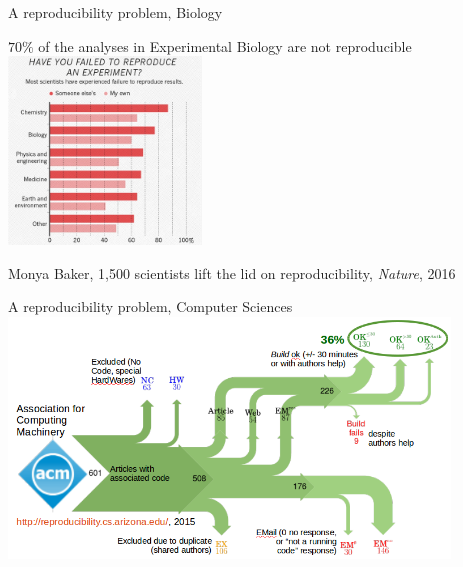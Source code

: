 \begin{frame}{A reproducibility problem, Biology}
\begin{center}
   \alert{$70\%$} of the analyses in Experimental Biology are \alert{not} reproducible
   \vfill
   \includegraphics[height=5cm]{01_introduction/images/FAIR_Baker_survey.png}
\end{center}
\tiny{Monya Baker, 1,500 scientists lift the lid on reproducibility, \textit{Nature}, 2016}
\end{frame}
\begin{frame}{A reproducibility problem, Computer Sciences}
    \includegraphics[height=6.4cm]{01_introduction/images/FAIR_acm_study.png}
\end{frame}
